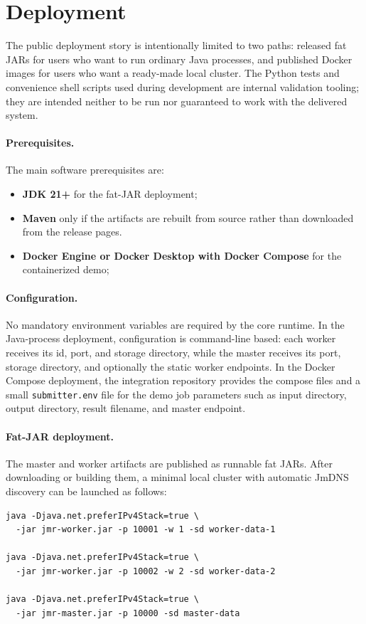 \documentclass{scrartcl}
\begin{document}
\section{Deployment}\label{deployment}
The public deployment story is intentionally limited to two paths: released fat JARs for users who want to run ordinary Java processes, and published Docker images for users who want a ready-made local cluster. The Python tests and convenience shell scripts used during development are internal validation tooling; they are intended neither to be run nor guaranteed to work with the delivered system.

\paragraph{Prerequisites.}
The main software prerequisites are:
%
\begin{itemize}
    \item \textbf{JDK 21+} for the fat-JAR deployment;
    \item \textbf{Maven} only if the artifacts are rebuilt from source rather than downloaded from the release pages.
    \item \textbf{Docker Engine or Docker Desktop with Docker Compose} for the containerized demo;
\end{itemize}

\paragraph{Configuration.}
No mandatory environment variables are required by the core runtime. In the Java-process deployment, configuration is command-line based: each worker receives its id, port, and storage directory, while the master receives its port, storage directory, and optionally the static worker endpoints. In the Docker Compose deployment, the integration repository provides the compose files and a small \texttt{submitter.env} file for the demo job parameters such as input directory, output directory, result filename, and master endpoint.

\paragraph{Fat-JAR deployment.}
The master and worker artifacts are published as runnable fat JARs. After downloading or building them, a minimal local cluster with automatic JmDNS discovery can be launched as follows:
%
\begin{verbatim}
java -Djava.net.preferIPv4Stack=true \
  -jar jmr-worker.jar -p 10001 -w 1 -sd worker-data-1

java -Djava.net.preferIPv4Stack=true \
  -jar jmr-worker.jar -p 10002 -w 2 -sd worker-data-2

java -Djava.net.preferIPv4Stack=true \
  -jar jmr-master.jar -p 10000 -sd master-data
\end{verbatim}
\end{document}
